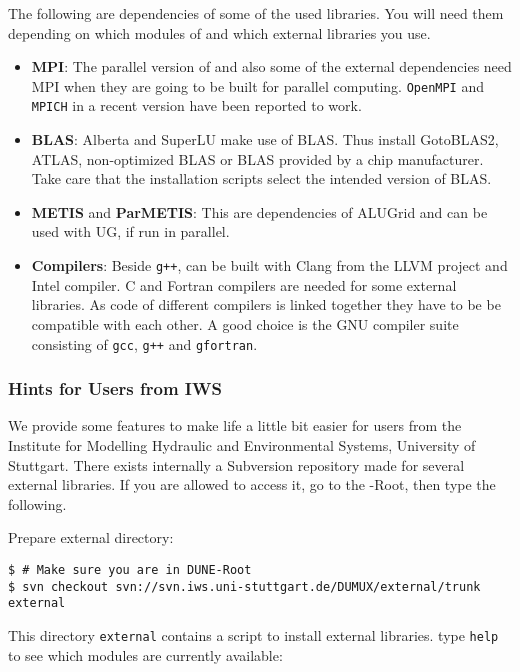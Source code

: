 The following are dependencies of some of the used libraries. You will need them
depending on which modules of \Dune and which external libraries you use.

\begin{itemize}
\item \textbf{MPI}: The parallel version of \Dune and also some of the external dependencies need MPI
  when they are going to be built for parallel computing. \texttt{OpenMPI} and \texttt{MPICH} in a recent
  version have been reported to work.

\item \textbf{BLAS}: Alberta and SuperLU make use of BLAS. Thus install GotoBLAS2, ATLAS, non-optimized BLAS
  or BLAS provided by a chip manufacturer. Take care that the installation scripts select the intended
  version of BLAS.

\item \textbf{METIS} and \textbf{ParMETIS}: This are dependencies of ALUGrid and can be used with UG, if run in parallel.

\item \textbf{Compilers}: Beside \texttt{g++}, \Dune can be built with Clang from the LLVM project and
  Intel \Cplusplus compiler. C and Fortran compilers are needed for some external libraries. As code of
  different compilers is linked together they have to be be compatible with each other. A good choice
  is the GNU compiler suite consisting of \texttt{gcc}, \texttt{g++} and \texttt{gfortran}.
\end{itemize}

\subsubsection{Hints for Users from IWS}
We provide some features to make life a little bit easier for
users from the Institute for Modelling Hydraulic and Environmental Systems, University of Stuttgart.
There exists internally a Subversion repository made for several external libraries.
If you are allowed to access it, go to the {\Dune}-Root, then type the following.

Prepare external directory:
\begin{lstlisting}[style=Bash]
$ # Make sure you are in DUNE-Root
$ svn checkout svn://svn.iws.uni-stuttgart.de/DUMUX/external/trunk external
\end{lstlisting}

This directory \texttt{external} contains a script to install external libraries.
type \texttt{help} to see which modules are currently available:

